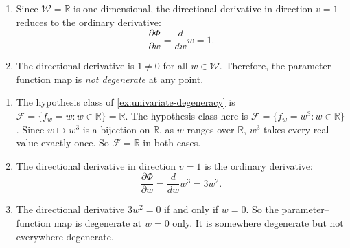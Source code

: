 \documentclass[11pt]{article}
\newcommand{\R}{\mathbb{R}}
\newcommand{\W}{\mathcal{W}}
\newcommand{\F}{\mathcal{F}}
\begin{document}
\begin{solution}
\begin{enumerate}
    \item Since $\W = \R$ is one-dimensional, the directional derivative in direction $v = 1$ reduces to the ordinary derivative:
    \begin{equation*}
        \frac{\partial \Phi}{\partial w} = \frac{d}{dw} w = 1.
    \end{equation*}

    \item The directional derivative is $1 \neq 0$ for all $w \in \W$. Therefore, the parameter--function map is \emph{not degenerate} at any point. \qedhere
\end{enumerate}
\end{solution}

\begin{solution}
\begin{enumerate}
    \item The hypothesis class of \cref{ex:univariate-degeneracy} is $\F = \{f_w = w : w \in \R\} = \R$. The hypothesis class here is $\F = \{f_w = w^3 : w \in \R\}$. Since $w \mapsto w^3$ is a bijection on $\R$, as $w$ ranges over $\R$, $w^3$ takes every real value exactly once. So $\F = \R$ in both cases.

    \item The directional derivative in direction $v = 1$ is the ordinary derivative:
    \begin{equation*}
        \frac{\partial \Phi}{\partial w} = \frac{d}{dw} w^3 = 3w^2.
    \end{equation*}

    \item The directional derivative $3w^2 = 0$ if and only if $w = 0$. So the parameter--function map is degenerate at $w = 0$ only. It is somewhere degenerate but not everywhere degenerate. \qedhere
\end{enumerate}
\end{solution}
\end{document}
